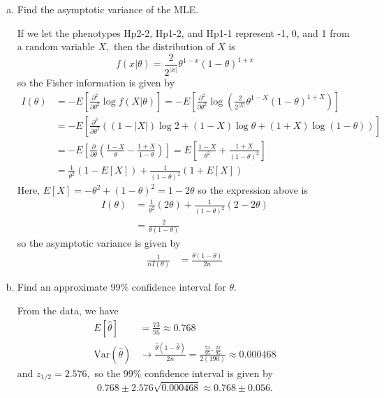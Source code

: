 \documentclass{article}
\newcommand{\var}{\mathrm{Var}}
\begin{document}
\begin{itemize}
\begin{enumerate}[a.]
			\item Find the asymptotic variance of the MLE.
				\begin{soln}
					If we let the phenotypes Hp2-2, Hp1-2, and Hp1-1 represent -1, 0, and 1 from a random variable $X,$ then the distribution of $X$ is \[f(x|\theta)=\frac{2}{2^{|x|}} \theta^{1-x}(1-\theta)^{1+x}\] so the Fisher information is given by 
					\begin{align*}
						I(\theta) &= -E\left[ \frac{\partial^2}{\partial\theta^2} \log f(X|\theta) \right] = -E\left[ \frac{\partial^2}{\partial\theta^2}\log\left( \frac{2}{2^{|X|}} \theta^{1-X}(1-\theta)^{1+X} \right) \right] \\
						&= -E\left[ \frac{\partial^2}{\partial\theta^2}\left( (1-|X|)\log 2 + (1-X)\log \theta + (1+X)\log (1-\theta) \right) \right] \\
						&= -E\left[ \frac{\partial}{\partial\theta}\left(\frac{1-X}{\theta}-\frac{1+X}{1-\theta}\right) \right] = E\left[ \frac{1-X}{\theta^2} + \frac{1+X}{(1-\theta)^2} \right] \\
						&= \frac{1}{\theta^2}\left( 1-E[X] \right) + \frac{1}{(1-\theta)^2}(1+E[X])
					\end{align*}
					Here, $E[X]=-\theta^2+(1-\theta)^2=1-2\theta$ so the expression above is
					\begin{align*}
						I(\theta) &= \frac{1}{\theta^2}(2\theta) + \frac{1}{(1-\theta)^2}(2-2\theta) \\
						&= \frac{2}{\theta(1-\theta)}
					\end{align*} so the asymptotic variance is given by 
					\begin{align*}
						\frac{1}{nI(\theta)} &= \frac{\theta(1-\theta)}{2n}
					\end{align*}
				\end{soln}

			\item Find an approximate 99\% confidence interval for $\theta.$
				\begin{soln}
					From the data, we have 
					\begin{align*}
						E[\hat{\theta}] &= \frac{73}{95}\approx 0.768 \\
						\var(\hat{\theta}) &\to \frac{\hat{\theta}(1-\hat{\theta})}{2n} = \frac{\frac{73}{95}\cdot\frac{22}{95}}{2(190)} \approx 0.000468
					\end{align*} and $z_{1/2}= 2.576,$ so the 99\% confidence interval is given by \[0.768\pm 2.576\sqrt{0.000468}\approx 0.768\pm 0.056.\]
				\end{soln}


\end{enumerate}
\end{itemize}
\end{document}
